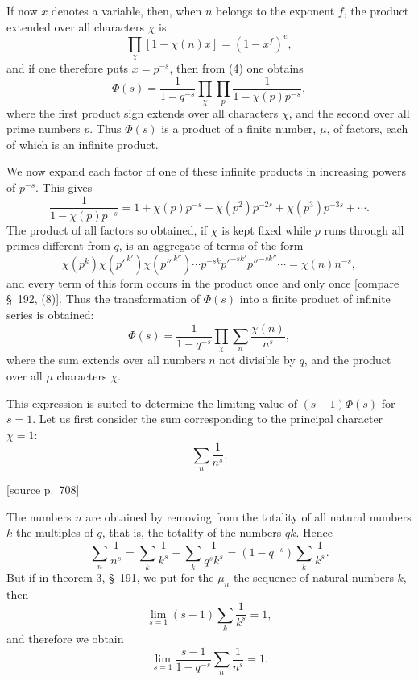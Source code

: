 \documentclass[11pt]{article}
\newcommand{\srcpage}[1]{\par\medskip\noindent\textsf{[source p.~#1]}\par\smallskip}
\begin{document}
If now $x$ denotes a variable, then, when $n$ belongs to the exponent $f$, the product extended over all characters $\chi$ is
\begin{equation}
\prod_\chi[1-\chi(n)x]=(1-x^f)^e,
\tag{9}
\end{equation}
and if one therefore puts $x=p^{-s}$, then from (4) one obtains
\begin{equation}
\Phi(s)=\frac1{1-q^{-s}}\prod_\chi\prod_p\frac1{1-\chi(p)p^{-s}},
\tag{10}
\end{equation}
where the first product sign extends over all characters $\chi$, and the second over all prime numbers $p$. Thus $\Phi(s)$ is a product of a finite number, $\mu$, of factors, each of which is an infinite product.

We now expand each factor of one of these infinite products in increasing powers of $p^{-s}$. This gives
\[
\frac1{1-\chi(p)p^{-s}}
=1+\chi(p)p^{-s}+\chi(p^2)p^{-2s}+\chi(p^3)p^{-3s}+\cdots .
\]
The product of all factors so obtained, if $\chi$ is kept fixed while $p$ runs through all primes different from $q$, is an aggregate of terms of the form
\[
\chi(p^k)\chi(p'^{\,k'})\chi(p''^{\,k''})\cdots p^{-sk}p'^{-sk'}p''^{-sk''}\cdots
=\chi(n)n^{-s},
\]
and every term of this form occurs in the product once and only once [compare \S~192, (8)]. Thus the transformation of $\Phi(s)$ into a finite product of infinite series is obtained:
\begin{equation}
\Phi(s)=\frac1{1-q^{-s}}\prod_\chi\sum_n\frac{\chi(n)}{n^s},
\tag{11}
\end{equation}
where the sum extends over all numbers $n$ not divisible by $q$, and the product over all $\mu$ characters $\chi$.

This expression is suited to determine the limiting value of $(s-1)\Phi(s)$ for $s=1$. Let us first consider the sum corresponding to the principal character $\chi=1$:
\[
\sum_n\frac1{n^s}.
\]

\srcpage{708}
The numbers $n$ are obtained by removing from the totality of all natural numbers $k$ the multiples of $q$, that is, the totality of the numbers $qk$. Hence
\[
\sum_n\frac1{n^s}=\sum_k\frac1{k^s}-\sum_k\frac1{q^s k^s}
=(1-q^{-s})\sum_k\frac1{k^s}.
\]
But if in theorem 3, \S~191, we put for the $\mu_n$ the sequence of natural numbers $k$, then
\[
\lim_{s=1}(s-1)\sum_k\frac1{k^s}=1,
\]
and therefore we obtain
\begin{equation}
\lim_{s=1}\frac{s-1}{1-q^{-s}}\sum_n\frac1{n^s}=1.
\tag{12}
\end{equation}
\end{document}
